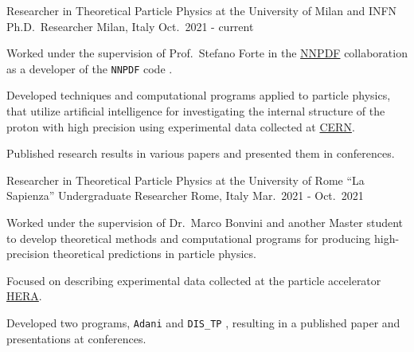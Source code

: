 

\begin{cventries}

  \cventry
  {Researcher in Theoretical Particle Physics at the University of Milan and INFN}
  {Ph.D.\ Researcher}
  {Milan, Italy}
  {Oct.\ 2021 - current}
  {
      \begin{cvitems} %
          \item Worked under the supervision of Prof.\ Stefano Forte in the \href{https://nnpdf.mi.infn.it}{NNPDF} collaboration 
          as a developer of the \texttt{NNPDF} code \href{https://github.com/NNPDF}{\faGithubSquare}.
          \item Developed techniques and computational programs applied to particle physics, that utilize artificial intelligence for 
          investigating the internal structure of the proton with high precision using experimental data collected at \href{https://home.cern}{CERN}.
          \item Published research results in various papers and presented them in conferences.
      \end{cvitems}
    }

    \cventry
{Researcher in Theoretical Particle Physics at the University of Rome ``La Sapienza''}
{Undergraduate Researcher}
{Rome, Italy}
{Mar.\ 2021 - Oct.\ 2021}
{
      \begin{cvitems} %
        \item Worked under the supervision of Dr.\ Marco Bonvini and another Master student to develop theoretical methods and computational programs for producing high-precision theoretical predictions in particle physics.
        \item Focused on describing experimental data collected at the particle accelerator \href{https://en.wikipedia.org/wiki/HERA_(particle_accelerator)}{HERA}.
        \item Developed two programs, \texttt{Adani} \href{https://github.com/niclaurenti/adani}{\faGithubSquare} and \texttt{DIS\_TP} \href{https://github.com/andreab1997/DIS_TP}{\faGithubSquare}, resulting in a published paper and presentations at conferences.
      \end{cvitems}
    }


\end{cventries}